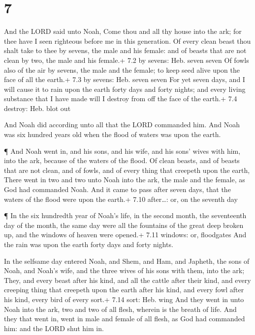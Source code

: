 \hypertarget{section-6}{%
\section{7}\label{section-6}}

 And the LORD said unto Noah, Come thou and all thy house
into the ark; for thee have I seen righteous before me in this
generation.  Of every clean beast thou shalt take to thee by
sevens, the male and his female: and of beasts that are not clean by
two, the male and his female.+ 7.2 by sevens: Heb. seven seven
 Of fowls also of the air by sevens, the male and the
female; to keep seed alive upon the face of all the earth.+ 7.3 by
sevens: Heb. seven seven  For yet seven days, and I will
cause it to rain upon the earth forty days and forty nights; and every
living substance that I have made will I destroy from off the face of
the earth.+ 7.4 destroy: Heb. blot out

 And Noah did according unto all that the LORD commanded
him.  And Noah was six hundred years old when the flood of
waters was upon the earth.

 ¶ And Noah went in, and his sons, and his wife, and his
sons' wives with him, into the ark, because of the waters of the flood.
 Of clean beasts, and of beasts that are not clean, and of
fowls, and of every thing that creepeth upon the earth, 
There went in two and two unto Noah into the ark, the male and the
female, as God had commanded Noah.  And it came to pass
after seven days, that the waters of the flood were upon the earth.+
7.10 after\ldots: or, on the seventh day

 ¶ In the six hundredth year of Noah's life, in the second
month, the seventeenth day of the month, the same day were all the
fountains of the great deep broken up, and the windows of heaven were
opened.+ 7.11 windows: or, floodgates  And the rain was
upon the earth forty days and forty nights.

 In the selfsame day entered Noah, and Shem, and Ham, and
Japheth, the sons of Noah, and Noah's wife, and the three wives of his
sons with them, into the ark;  They, and every beast after
his kind, and all the cattle after their kind, and every creeping thing
that creepeth upon the earth after his kind, and every fowl after his
kind, every bird of every sort.+ 7.14 sort: Heb. wing  And
they went in unto Noah into the ark, two and two of all flesh, wherein
is the breath of life.  And they that went in, went in male
and female of all flesh, as God had commanded him: and the LORD shut him
in.

